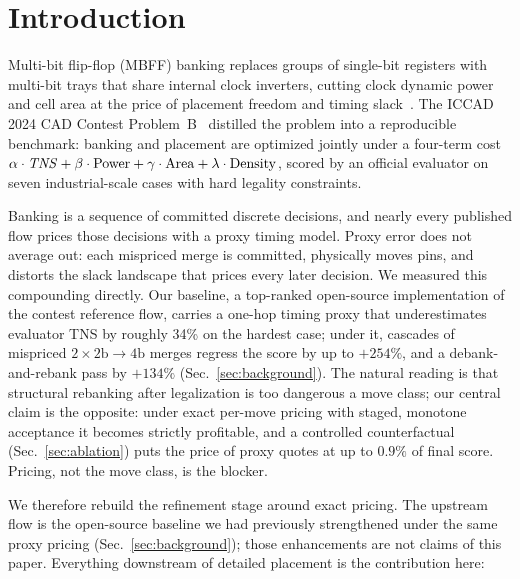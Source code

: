 \section{Introduction}

Multi-bit flip-flop (MBFF) banking replaces groups of single-bit registers with multi-bit trays that share internal clock inverters, cutting clock dynamic power and cell area at the price of placement freedom and timing slack~\cite{chang2010postplacement,shyu2013effective,kahng2016floptray}. The ICCAD 2024 CAD Contest Problem~B~\cite{yang2024contest,fang2024overview} distilled the problem into a reproducible benchmark: banking and placement are optimized jointly under a four-term cost $\alpha\cdot\mathit{TNS} + \beta\cdot\mathrm{Power} + \gamma\cdot\mathrm{Area} + \lambda\cdot\mathrm{Density}$, scored by an official evaluator on seven industrial-scale cases with hard legality constraints.

Banking is a sequence of committed discrete decisions, and nearly every published flow prices those decisions with a proxy timing model. Proxy error does not average out: each mispriced merge is committed, physically moves pins, and distorts the slack landscape that prices every later decision. We measured this compounding directly. Our baseline, a top-ranked open-source implementation of the contest reference flow, carries a one-hop timing proxy that underestimates evaluator TNS by roughly 34\% on the hardest case; under it, cascades of mispriced $2{\times}2\mathrm{b}{\to}4\mathrm{b}$ merges regress the score by up to $+254\%$, and a debank-and-rebank pass by $+134\%$ (Sec.~\ref{sec:background}). The natural reading is that structural rebanking after legalization is too dangerous a move class; our central claim is the opposite: under exact per-move pricing with staged, monotone acceptance it becomes strictly profitable, and a controlled counterfactual (Sec.~\ref{sec:ablation}) puts the price of proxy quotes at up to $0.9\%$ of final score. Pricing, not the move class, is the blocker.

We therefore rebuild the refinement stage around exact pricing. The upstream flow is the open-source baseline we had previously strengthened under the same proxy pricing (Sec.~\ref{sec:background}); those enhancements are not claims of this paper. Everything downstream of detailed placement is the contribution here:

